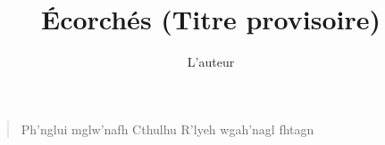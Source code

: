 \documentclass[ebook,oneside]{memoir}
\title{Écorchés (Titre provisoire)}
\author{L'auteur}
\begin{document}
\maketitle

\begin{verse}
Ph’nglui mglw’nafh Cthulhu R’lyeh wgah’nagl fhtagn
\end{verse}

\frontmatter


\mainmatter


\backmatter
\tableofcontents
\end{document}
